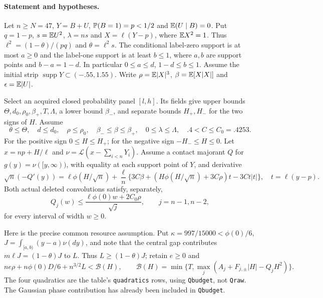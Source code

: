 \paragraph{Statement and hypotheses.}
Let $n\ge N=47$, $Y=B+U$, $\mathbb P(B=1)=p<1/2$ and $\mathbb E(U\mid B)=0$.
Put $q=1-p$, $s=\mathbb E U^2$, $\lambda=ns$ and $X=\ell(Y-p)$, where
$\mathbb E X^2=1$. Thus $\ell^2=(1-\theta)/(pq)$ and $\theta=\ell^2s$.
The conditional label-zero support is at most $a\ge0$ and the label-one
support is at least $b\le1$, where $a,b$ are support points and
$b-a=1-d$. In particular $0\le a\le d$, $1-d\le b\le1$.
Assume the initial strip $\operatorname{supp}Y\subset(-.55,1.55)$.
Write $\rho=\mathbb E|X|^3$, $\beta=\mathbb E[X|X|]$ and $\epsilon=\mathbb E|U|$.

Select an acquired closed probability panel $[l,h]$.
Its fields give upper bounds $\Theta,d_0,\rho_0,\beta_+,T,\Lambda$,
a lower bound $\beta_-$, and separate bounds $H_+,H_-$ for the two signs of
$H$. Assume
\[
 \theta\le\Theta,\quad d\le d_0,\quad \rho\le\rho_0,
 \quad \beta_-\le\beta\le\beta_+,\quad 0\le\lambda\le\Lambda,
 \quad .4<C\le C_0=.4253.
\]
For the positive sign $0\le H\le H_+$; for the negative sign
$-H_-\le H\le0$. Let $x=np+H/\ell$ and
$\nu=\mathcal L(x-\sum_{i<n}Y_i)$. Assume a contact majorant $Q$ for
$g(y)=\nu([y,\infty))$, with equality at each support point of $Y$,
and derivative
\begin{equation}\label{j:local:conf:derivative}
 \sqrt n(-Q'(y))=\ell\phi(H/\sqrt n)
 +\frac\ell n\{3C\beta+(H\phi(H/\sqrt n)+3C\rho)t-3Ct|t|\},
 \quad t=\ell(y-p).
\end{equation}
Both actual deleted convolutions satisfy, separately,
\begin{equation}\label{j:local:conf:concentration}
 Q_j(w)\le\frac{\ell\phi(0)w+2C_0\rho}{\sqrt j},
 \qquad j=n-1,n-2,
\end{equation}
for every interval of width $w\ge0$.

Here is the precise common resource assumption. Put
$\kappa=997/15000<\phi(0)/6$, $J=\int_{[a,b)}(y-a)\nu(dy)$,
and note that the central gap contributes $m\ell J=(1-\theta)J$ to $L$.
Thus $L\ge(1-\theta)J$; retain $e\ge0$ and
\begin{equation}\label{j:local:conf:budget}
 n e\rho+n\phi(0)D/6+n^{3/2}L<\mathcal B(H),\qquad
 \mathcal B(H)=\min\{T,\max_j(A_j+F_{j,\pm}|H|-Q_jH^2)\}.
\end{equation}
The four quadratics are the table's \texttt{quadratics} rows, using
\texttt{Qbudget}, not \texttt{Qraw}. The Gaussian phase contribution
has already been included in \texttt{Qbudget}.

